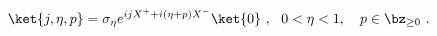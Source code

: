 \begin{equation}
\ket{j,\eta,p} = \sigma_{\eta} e^{ijX^+ + i(\eta+p)X^-}
\ket{0}~,~~ 0<\eta<1,~~~ p\in \bz_{\geq 0}~.
\end{equation}

